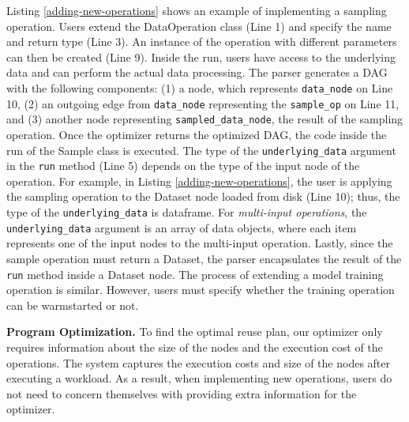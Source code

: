 

        
        
Listing \ref{adding-new-operations} shows an example of implementing a sampling operation.
Users extend the DataOperation class (Line 1) and specify the name and return type (Line 3).
An instance of the operation with different parameters can then be created (Line 9).
Inside the run, users have access to the underlying data and can perform the actual data processing.
The parser generates a DAG with the following components: (1) a node, which represents \texttt{data\_node} on Line 10, (2) an outgoing edge from \texttt{data\_node} representing the \texttt{sample\_op} on Line 11, and (3) another node representing \texttt{sampled\_data\_node}, the result of the sampling operation.
Once the optimizer returns the optimized DAG, the code inside the run of the Sample class is executed.
The type of the \texttt{underlying\_data} argument in the \texttt{run} method (Line 5) depends on the type of the input node of the operation.
For example, in Listing \ref{adding-new-operations}, the user is applying the sampling operation to the Dataset node loaded from disk (Line 10); thus, the type of the \texttt{underlying\_data} is dataframe.
For \textit{multi-input operations}, the \texttt{underlying\_data} argument is an array of data objects, where each item represents one of the input nodes to the multi-input operation.
Lastly, since the sample operation must return a Dataset, the parser encapsulates the result of the \texttt{run} method inside a Dataset node.
The process of extending a model training operation is similar.
However, users must specify whether the training operation can be warmstarted or not.

\textbf{Program Optimization.}
To find the optimal reuse plan, our optimizer only requires information about the size of the nodes and the execution cost of the operations.
The system captures the execution costs and size of the nodes after executing a workload.
As a result, when implementing new operations, users do not need to concern themselves with providing extra information for the optimizer.

